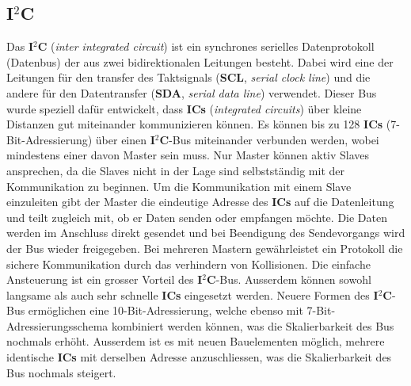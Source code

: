 \subsection{I$^{2}$C}
\label{subsubsec:I2C}
Das \textbf{I$^{2}$C} (\textit{inter integrated circuit}) ist ein synchrones serielles Datenprotokoll (Datenbus) der aus zwei bidirektionalen Leitungen besteht. Dabei wird eine der Leitungen für den transfer des Taktsignals (\textbf{SCL}, \textit{serial clock line}) und die andere für den Datentransfer (\textbf{SDA}, \textit{serial data line}) verwendet. Dieser Bus wurde speziell dafür entwickelt, dass \textbf{ICs} (\textit{integrated circuits}) über kleine Distanzen gut miteinander kommunizieren können. Es können bis zu 128 \textbf{ICs} (7-Bit-Adressierung) über einen \textbf{I$^{2}$C}-Bus miteinander verbunden werden, wobei mindestens einer davon Master sein muss. Nur Master können aktiv Slaves ansprechen, da die Slaves nicht in der Lage sind selbstständig mit der Kommunikation zu beginnen. Um die Kommunikation mit einem Slave einzuleiten gibt der Master die eindeutige Adresse des \textbf{ICs} auf die Datenleitung und teilt zugleich mit, ob er Daten senden oder empfangen möchte. Die Daten werden im Anschluss direkt gesendet und bei Beendigung des Sendevorgangs wird der Bus wieder freigegeben. Bei mehreren Mastern gewährleistet ein Protokoll die sichere Kommunikation durch das verhindern von Kollisionen. Die einfache Ansteuerung ist ein grosser Vorteil des \textbf{I$^{2}$C}-Bus. Ausserdem können sowohl langsame als auch sehr schnelle \textbf{ICs} eingesetzt werden. Neuere Formen des \textbf{I$^{2}$C}-Bus ermöglichen eine 10-Bit-Adressierung, welche ebenso mit 7-Bit-Adressierungsschema kombiniert werden können, was die Skalierbarkeit des Bus nochmals erhöht. Ausserdem ist es mit neuen Bauelementen möglich, mehrere identische \textbf{ICs} mit derselben Adresse anzuschliessen, was die Skalierbarkeit des Bus nochmals steigert. \cite{mcI2C} \cite{rnI2C}\\